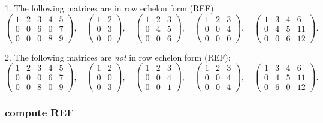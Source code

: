 \documentclass[12pt]{article}
\begin{document}
1. The following matrices are in row echelon form (REF):
\[
\begin{pmatrix}
1&2&3&4&5\\
0&0&6&0&7\\
0&0&0&8&9
\end{pmatrix},
\quad
\begin{pmatrix}
1&2\\
0&3\\
0&0
\end{pmatrix},
\quad
\begin{pmatrix}
1&2&3\\
0&4&5\\
0&0&6
\end{pmatrix},
\quad
\begin{pmatrix}
1&2&3\\
0&0&4\\
0&0&0
\end{pmatrix},
\quad
\begin{pmatrix}
1&3&4&6\\
0&4&5&11\\
0&0&6&12
\end{pmatrix}.
\]

2. The following matrices are \emph{not} in row echelon form (REF):
\[
\begin{pmatrix}
1&2&3&4&5\\
0&0&0&6&7\\
0&0&8&0&9
\end{pmatrix},
\quad
\begin{pmatrix}
1&2\\
0&0\\
0&3
\end{pmatrix},
\quad
\begin{pmatrix}
1&2&3\\
0&0&4\\
0&0&1
\end{pmatrix},
\quad
\begin{pmatrix}
1&2&3\\
0&0&4\\
0&0&4
\end{pmatrix},
\quad
\begin{pmatrix}
1&3&4&6\\
0&4&5&11\\
0&6&0&12
\end{pmatrix}.
\]

\newpage

\subsubsection{compute REF}
\end{document}
